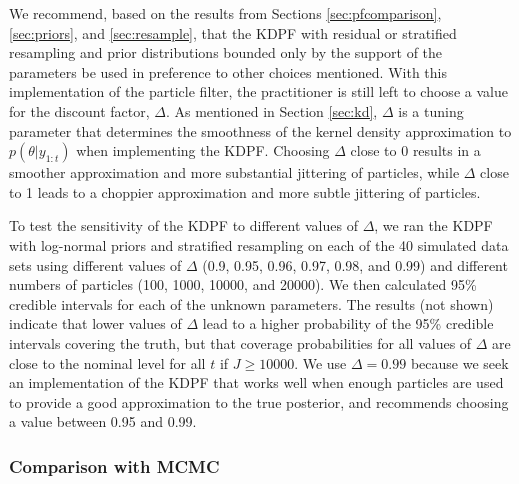 \documentclass{elsarticle}
\newcommand{\danny}[1]{{\color{blue} DANNY: #1}}
\begin{document}
We recommend, based on the results from Sections \ref{sec:pfcomparison}, \ref{sec:priors}, and \ref{sec:resample}, that the KDPF with residual or stratified resampling and prior distributions bounded only by the support of the parameters be used in preference to other choices mentioned. With this implementation of the particle filter, the practitioner is still left to choose a value for the discount factor, $\Delta$. As mentioned in Section \ref{sec:kd}, $\Delta$ is a tuning parameter that determines the smoothness of the kernel density approximation to $p(\theta|y_{1:t})$ when implementing the KDPF. Choosing $\Delta$ close to 0 results in a smoother approximation and more substantial jittering of particles, while $\Delta$ close to 1 leads to a choppier approximation and more subtle jittering of particles.

To test the sensitivity of the KDPF to different values of $\Delta$, we ran the KDPF with log-normal priors and stratified resampling on each of the 40 simulated data sets using different values of $\Delta$ (0.9, 0.95, 0.96, 0.97, 0.98, and 0.99) and different numbers of particles (100, 1000, 10000, and 20000). We then calculated 95\% credible intervals for each of the unknown parameters. The results (not shown) indicate that lower values of $\Delta$ lead to a higher probability of the 95\% credible intervals covering the truth, but that coverage probabilities for all values of $\Delta$ are close to the nominal level for all $t$ if $J \ge 10000$. We use $\Delta = 0.99$ because we seek an implementation of the KDPF that works well when enough particles are used to provide a good approximation to the true posterior, and \citet{Liu:West:comb:2001} recommends choosing a value between 0.95 and 0.99.


\subsubsection{Comparison with MCMC}
\end{document}
